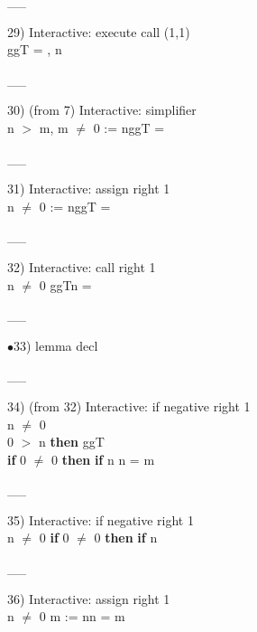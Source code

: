 \documentclass[a4paper]{article}
\begin{document}
\vspace{-1.5ex}\_\hrulefill \_

29) Interactive: execute call  (1,1)\\
\Do ggT\Dc {} = , n %

\vspace{-1.5ex}\_\hrulefill \_

30)  (from 7) Interactive: simplifier \\
n $>$ m, \Not m $\neq$ 0 \Fol \Do {} := n\Dc \Do ggT\Dc {} = 

\vspace{-1.5ex}\_\hrulefill \_

31) Interactive: assign right  1\\
n $\neq$ 0 \Fol \Do {} := n\Dc \Do ggT\Dc {} = 

\vspace{-1.5ex}\_\hrulefill \_

32) Interactive: call right  1\\
n $\neq$ 0 \Fol \Do ggT\Dc n = 

\vspace{-1.5ex}\_\hrulefill \_

$\bullet$33) lemma decl \\
 \Fol 

\vspace{-1.5ex}\_\hrulefill \_

34)  (from 32) Interactive: if negative right  1\\
\tabf n $\neq$ 0 \\
\Fol {} 0 $>$ n {\bf then} ggT \\
 \tabf {} {\bf if} 0 $\neq$ 0 {\bf then} {\bf if} n %
n = m

\vspace{-1.5ex}\_\hrulefill \_

35) Interactive: if negative right  1\\
n $\neq$ 0 \Fol \Do 
{\bf if} 0 $\neq$ 0 {\bf then} 
{\bf if} n %

\vspace{-1.5ex}\_\hrulefill \_

36) Interactive: assign right  1\\
n $\neq$ 0 \Fol \Do m := n\Dc n = m
\end{document}
